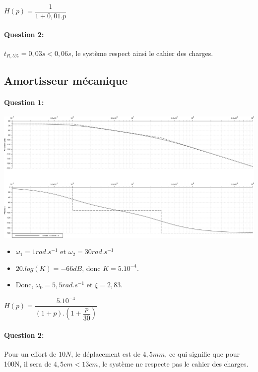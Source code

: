 $H(p)=\dfrac{1}{1+0,01.p}$

\paragraph{Question 2:}

$t_{R,5\%}=0,03s<0,06s$, le système respect ainsi le cahier des charges.

\subsection{Amortisseur mécanique}

\paragraph{Question 1:}

\begin{center}
 \includegraphics[width=0.8\linewidth]{img/exo_2_cor}
\end{center}

\begin{minipage}{0.5\linewidth}
\begin{itemize}
 \item $\omega_1=1rad.s^{-1}$ et $\omega_2=30rad.s^{-1}$
 \item $20.log(K)=-66dB$, donc $K=5.10^{-4}$.
 \item Donc, $\omega_0=5,5rad.s^{-1}$ et $\xi=2,83$.
\end{itemize}
\end{minipage}\hfill
\begin{minipage}{0.4\linewidth}
$H(p)=\dfrac{5.10^{-4}}{(1+p).(1+\dfrac{p}{30})}$
\end{minipage}

\paragraph{Question 2:}

Pour un effort de $10N$, le déplacement est de $4,5mm$, ce qui signifie que pour 100N, il sera de $4,5cm<13cm$, le système ne respecte pas le cahier des charges.

